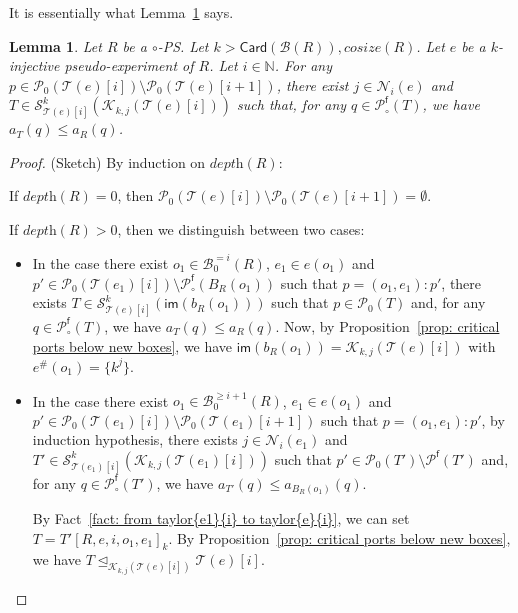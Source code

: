 \documentclass{article}
\theoremstyle{plain}
\newtheorem{lem}[theorem]{Lemma}
\newcommand{\Nat}{\ensuremath{\mathbb{N}}}
\newcommand{\nontrivialconnected}[3]{\mathcal{S}_{#1}^{#3}(#2)}
\newcommand{\taylor}[2]{\mathcal{T}(#1)[#2]}
\newcommand{\criticalports}[3]{\mathcal{K}_{#2, #3}(#1)}
\newcommand{\cosize}[1]{\textit{cosize}(#1)}
\newcommand{\depthof}[1]{\textit{depth}(#1)}
\newcommand{\im}[1]{\textsf{im}(#1)}
\newcommand{\portsatzero}[1]{\mathcal{P}_0(#1)}
\newcommand{\arity}[1]{{\textit{a}}_{#1}}
\newcommand{\conclusions}[1]{\mathcal{P}^{\textsf{f}}(#1)}
\newcommand{\Card}[1]{\textsf{Card}\left( #1 \right)}
\newcommand{\conclusionscirc}[1]{\mathcal{P}_\circ^{\textsf{f}}(#1)}
\newcommand{\boxes}[1]{\mathcal{B}(#1)}
\newcommand{\exactboxesatzero}[2]{\mathcal{B}_{0}^{=#2}(#1)}
\newcommand{\boxesatzerogeq}[2]{\mathcal{B}_0^{\geq #2}(#1)}
\begin{document}
It is essentially what Lemma~\ref{lem: P_k subseteq ports of taylor} says. 



\begin{lem}\label{lem: P_k subseteq ports of taylor}
Let $R$ be a $\circ$-PS. Let $k > \Card{\boxes{R}{}}, \cosize{R}$. 
Let $e$ be a $k$-injective pseudo-experiment of $R$. Let $i \in \Nat$. For any $p \in \portsatzero{\taylor{e}{i}} \setminus \portsatzero{\taylor{e}{i+1}}$, there exist $j \in \mathcal{N}_{i}(e)$ and $T \in \nontrivialconnected{\taylor{e}{i}}{\criticalports{\taylor{e}{i}}{k}{j}}{k}$ such that, for any $q \in \conclusionscirc{T}$, we have $\arity{T}(q) \leq \arity{R}(q)$.
\end{lem}

\begin{proof}
(Sketch) 
By induction on $\depthof{R}$:

If $\depthof{R} = 0$, then $\portsatzero{\taylor{e}{i}} \setminus \portsatzero{\taylor{e}{i+1}} = \emptyset$.

If $\depthof{R} > 0$, then we distinguish between two cases:
\begin{itemize}
\item In the case there exist $o_1 \in \exactboxesatzero{R}{i}$, $e_1 \in e(o_1)$ and $p' \in \portsatzero{\taylor{e_1}{i}} \setminus \conclusionscirc{B_R(o_1)}$ such that $p = (o_1, e_1):p'$, 
there exists $T \in \nontrivialconnected{\taylor{e}{i}}{\im{b_R(o_1)}}{k}$ such that $p \in \portsatzero{T}$ and, for any $q \in \conclusionscirc{T}$, we have $\arity{T}(q) \leq \arity{R}(q)$. 
Now, by Proposition~\ref{prop: critical ports below new boxes}, we have $\im{b_R(o_1)} = \criticalports{\taylor{e}{i}}{k}{j}$ with $e^\#(o_1) = \{ k^j \}$.
\item In the case there exist $o_1 \in \boxesatzerogeq{R}{i+1}$, $e_1 \in e(o_1)$ and $p' \in \portsatzero{\taylor{e_1}{i}} \setminus \portsatzero{\taylor{e_1}{i+1}}$ such that $p = (o_1, e_1):p'$, by induction hypothesis, there exists $j \in \mathcal{N}_i(e_1)$ and $T' \in \nontrivialconnected{\taylor{e_1}{i}}{\criticalports{\taylor{e_1}{i}}{k}{j}}{k}$ such that $p' \in \portsatzero{T'} \setminus \conclusions{T'}$ and, for any $q \in \conclusionscirc{T'}$, we have $\arity{T'}(q) \leq \arity{B_R(o_1)}(q)$. 

By Fact~\ref{fact: from taylor{e1}{i} to taylor{e}{i}}, we can set $T = T'[R, e, i, o_1, e_1]_k$. By 
Proposition~\ref{prop: critical ports below new boxes}, we have $T \trianglelefteq_{\criticalports{\taylor{e}{i}}{k}{j}} \taylor{e}{i}$.



\end{itemize}
\end{proof}
\end{document}
